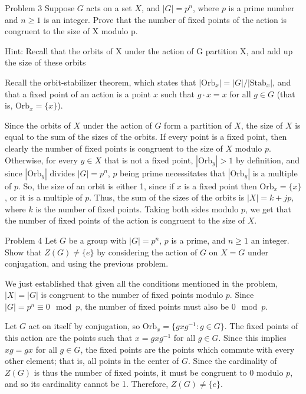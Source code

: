 \documentclass{hmwk}
\begin{document}
\begin{problem}{Problem 3}
Suppose $G$ acts on a set $X$, and $|G| = p^n$, where $p$ is a prime number and $n \geq 1$ is an integer. Prove that the number of fixed points of the action is congruent to the size of X modulo p.    

\noindent Hint: Recall that the orbits of X under the action of G partition X, and add up the
size of these orbits
\end{problem}

\begin{solution}

\pre Recall the orbit-stabilizer theorem, which states that $|\text{Orb}_x| = |G|/|\text{Stab}_x|$, and that a fixed point of an action is a point $x$ such that $g \cdot x = x$ for all $g \in G$ (that is, $\text{Orb}_x = \{x\}$).  

\pre Since the orbits of $X$ under the action of $G$ form a partition of $X$, the size of $X$ is equal to the sum of the sizes of the orbits. If every point is a fixed point, then clearly the number of fixed points is congruent to the size of $X$ modulo $p$. Otherwise, for every $y \in X$ that is not a fixed point, $|\text{Orb}_y| > 1$ by definition, and since $|\text{Orb}_y|$ divides $|G| = p^n$, $p$ being prime necessitates that $|\text{Orb}_y|$ is a multiple of $p$. So, the size of an orbit is either 1, since if $x$ is a fixed point then $\text{Orb}_x = \{x\}$, or it is a multiple of $p$. Thus, the sum of the sizes of the orbits is $|X| = k + jp$, where $k$ is the number of fixed points. Taking both sides modulo $p$, we get that the number of fixed points of the action is congruent to the size of $X$. 
\end{solution}

\begin{problem}{Problem 4}
Let $G$ be a group with $|G| = p^n$, $p$ is a prime, and $n \geq 1$ an integer. Show that $Z(G) \neq \{e\}$ by considering the action of $G$ on $X = G$ under conjugation, and using the previous problem.  
\end{problem}

\begin{solution}

\pre We just established that given all the conditions mentioned in the problem, $|X| = |G|$ is congruent to the number of fixed points modulo $p$. Since $|G| = p^n \equiv 0 \mod p$, the number of fixed points must also be $0 \mod p$. 

\pre Let $G$ act on itself by conjugation, so $\text{Orb}_x = \{gxg^{-1} : g \in G\}$. The fixed points of this action are the points such that $x = gxg^{-1}$ for all $g \in G$. Since this implies $xg = gx$ for all $g \in G$, the fixed points are the points which commute with every other element; that is, all points in the center of $G$. Since the cardinality of $Z(G)$ is thus the number of fixed points, it must be congruent to 0 modulo $p$, and so its cardinality cannot be 1. Therefore, $Z(G) \neq \{e\}$.

\end{solution}
\end{document}
